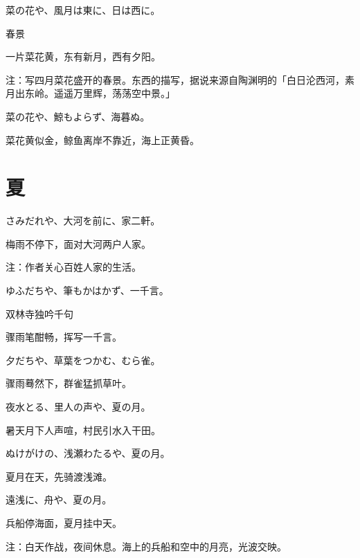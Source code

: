 \begin{haiku}
    {\FH 菜の花や、風月は東に、日は西に。}

    {\FK 春景}

    {\FK 一片菜花黄，东有新月，西有夕阳。}

    {\FT 注：写四月菜花盛开的春景。东西的描写，据说来源自陶渊明的「白日沦西河，素月出东岭。遥遥万里辉，荡荡空中景。」}
\end{haiku}

\begin{haiku}
    {\FH 菜の花や、鯨もよらず、海暮ぬ。}

    {\FK 菜花黄似金，鲸鱼离岸不靠近，海上正黄昏。}
\end{haiku}

\section{\FK 夏}

\setcounter{haikucounter}{0}

\begin{haiku}
    {\FH さみだれや、大河を前に、家二軒。}

    {\FK 梅雨不停下，面对大河两户人家。}

    {\FT 注：作者关心百姓人家的生活。}
\end{haiku}

\begin{haiku}
    {\FH ゆふだちや、筆もかはかず、一千言。}

    {\FK 双林寺独吟千句}

    {\FK 骤雨笔酣畅，挥写一千言。}
\end{haiku}

\begin{haiku}
    {\FH 夕だちや、草葉をつかむ、むら雀。}

    {\FK 骤雨蓦然下，群雀猛抓草叶。}
\end{haiku}

\begin{haiku}
    {\FH 夜水とる、里人の声や、夏の月。}

    {\FK 暑天月下人声喧，村民引水入干田。}
\end{haiku}

\begin{haiku}
    {\FH ぬけがけの、浅瀬わたるや、夏の月。}

    {\FK 夏月在天，先骑渡浅滩。}
\end{haiku}

\begin{haiku}
    {\FH 遠浅に、舟や、夏の月。}

    {\FK 兵船停海面，夏月挂中天。}

    {\FT 注：白天作战，夜间休息。海上的兵船和空中的月亮，光波交映。}
\end{haiku}

